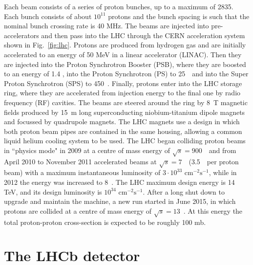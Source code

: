 Each beam consists of a series of proton bunches, up to a maximum of 2835. Each bunch consists of about $10^{11}$
protons and the bunch spacing is such that the nominal bunch crossing rate is 40 MHz. The beams are injected into
pre-accelerators and then pass into the LHC through the CERN acceleration system shown in Fig.~\ref{fig:lhc}. Protons are
produced from hydrogen gas and are initially accelerated to an energy of 50 MeV in a linear accelerator (LINAC).
Then they are injected into the Proton Synchrotron Booster (PSB), where they are boosted to an energy of 1.4 \gev,
into the Proton Synchrotron (PS) to 25~\gev~and into the Super Proton Synchrotron (SPS) to 450~\gev. Finally, protons
enter into the LHC storage ring, where they are accelerated from injection energy to the final one
by radio frequency (RF) cavities. The beams are steered around the ring by 8~T magnetic fields produced by 15~m long
superconducting niobium-titanium dipole magnets and focussed by quadrupole magnets. The LHC magnets
use a design in which both proton beam pipes are contained in the same housing, allowing a common liquid helium cooling
system to be used. The LHC began colliding proton beams in ``physics mode" in 2009 at a centre of mass
energy of $\sqrt{s} = 900$~\gev~and from April 2010 to November 2011 accelerated beams at $\sqrt{s} = 7$~\tev~(3.5~\tev~per
proton beam) with a maximum instantaneous luminosity of $3\cdot10^{33} \text{ cm}^{-2}\text{s}^{-1}$, while in
2012 the energy was increased to 8~\tev. The LHC maximum design energy is 14 TeV, and its design
luminosity is $10^{34} \text{ cm}^{-2}\text{s}^{-1}$. After a long shut down to upgrade and maintain the machine, a
new run started in June 2015, in which protons are collided at a centre of mass energy of $\sqrt{s} = 13$~\tev. At this
energy the total proton-proton cross-section is expected to be roughly 100 mb.

\section{The LHCb detector}

